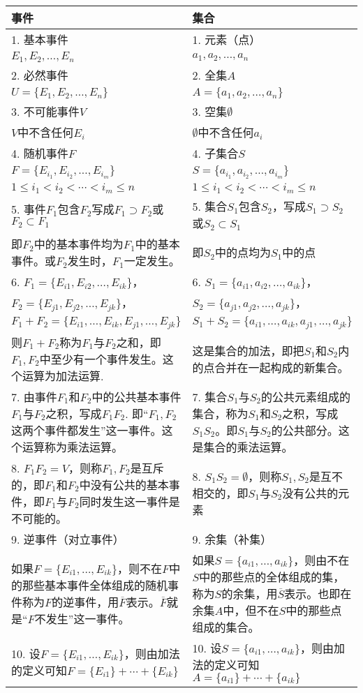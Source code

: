 \begin{longtable}{p{}p{}}
\hline
事件& 集合\\
\hline
1. 基本事件  &1. 元素（点）\\
$E_1,E_2,\ldots, E_n$ &$a_1,a_2,\ldots,a_n$\\
\hline
2. 必然事件 & 2. 全集$A$\\
$U=\{ E_1,E_2,\ldots, E_n\}$ & $A=\{a_1,a_2,\ldots,a_n\}$\\
\hline
3. 不可能事件$V$  &  3. 空集$\emptyset$\\
$V$中不含任何$E_i$& $\emptyset$中不含任何$a_i$\\
\hline
4. 随机事件$F$ &  4. 子集合$S$\\
$F=\{E_{i_1},E_{i_2},\ldots,E_{i_m}\}$&$S=\{a_{i_1},a_{i_2},\ldots,a_{i_m}\}$\\
$1\le i_1< i_2<\cdots <{i_m}\le n$&$1\le i_1<i_2<\cdots<i_m\le n$\\
\hline
5. 事件$F_1$包含$F_2$写成$F_1\supset F_2$或$F_2\subset F_1$  &  5. 集合$S_1$包含$S_2$，写成$S_1\supset S_2$或$S_2\subset S_1$\\
即$F_2$中的基本事件均为$F_1$中的基本事件。或$F_2$发生时，$F_1$一定发生。 &即$S_2$中的点均为$S_1$中的点\\
\hline
6. $F_1=\{E_{i1},E_{i2},\ldots,E_{ik}\}$，&   6. $S_1=\{a_{i1},a_{i2},\ldots,a_{ik}\}$，\\
$F_2=\{E_{j1},E_{j2},\ldots,E_{jk}\}$，& $S_2=\{a_{j1},a_{j2},\ldots,a_{jk}\}$，\\
\small $F_1+F_2=\{E_{i1},\ldots,E_{ik}, E_{j1},\ldots,E_{jk}\}$  &$S_1+S_2=\{a_{i1},\ldots,a_{ik},a_{j1},\ldots,a_{jk}\}$\\
则$F_1+F_2$称为$F_1$与$F_2$之和，即$F_1, F_2$中至少有一个事件发生。这个运算为加法运算.
& 这是集合的加法，即把$S_1$和$S_2$内的点合并在一起构成的新集合。\\
\hline
7. 由事件$F_1$和$F_2$中的公共基本事件$F_1$与$F_2$之积，写成$F_1F_2$. 即“$F_1,F_2$这两个事件都发生”这一事件。这个运算称为乘法运算。&7. 集合$S_1$与$S_2$的公共元素组成的集合，称为$S_1$和$S_2$之积，写成$S_1S_2$。即$S_1$与$S_2$的公共部分。这是集合的乘法运算。\\
\hline
8. $F_1F_2=V$，则称$F_1,F_2$是互斥的，即$F_1$和$F_2$中没有公共的基本事件，即$F_1$与$F_2$同时发生这一事件是不可能的。&
8. $S_1S_2=\emptyset$，则称$S_1,S_2$是互不相交的，即$S_1$与$S_2$没有公共的元素
\\
\hline
9. 逆事件（对立事件）&9. 余集（补集）\\
如果$F=\{E_{i1},\ldots,E_{ik}\}$，则不在$F$中的那些基本事件全体组成的随机事件称为$F$的逆事件，用$\overline{F}$表示。$\overline{F}$就是“$F$不发生”这一事件。
& 
如果$S=\{a_{i1},\ldots,a_{ik}\}$，则由不在$S$中的那些点的全体组成的集，称为$S$的余集，用$\overline{S}$表示。也即在余集$A$中，但不在$S$中的那些点组成的集合。\\
\hline
10. 设$F=\{E_{i1},\ldots,E_{ik}\}$，则由加法的定义可知$F=\{E_{i1}\}+\cdots +\{E_{ik}\}$ & 10. 设$S=\{a_{i1},\ldots,a_{ik}\}$，则由加法的定义可知$A=\{a_{i1}\}+\cdots+\{a_{ik}\}$\\
\hline
\end{longtable}

